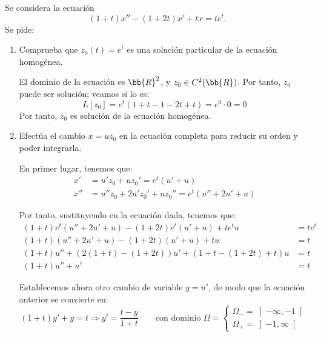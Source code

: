 \begin{ejercicio}\label{ej:4.4}
    Se considera la ecuación
    \[
        (1 + t)x'' - (1 + 2t)x' + tx = t e^t.
    \]
    Se pide:
    \begin{enumerate}
        \item Comprueba que $z_0(t) = e^t$ es una solución particular de la ecuación homogénea.
        
        El dominio de la ecuación es $\bb{R}^2$, y $z_0\in C^2(\bb{R})$. Por tanto, $z_0$ puede ser solución; veamos si lo es:
        \begin{equation*}
            L[z_0]=e^t(1+t-1-2t+t)=e^0\cdot 0=0
        \end{equation*}
        Por tanto, $z_0$ es solución de la ecuación homogénea.
        \item Efectúa el cambio $x = uz_0$ en la ecuación completa para reducir su orden y poder integrarla.
        
        En primer lugar, tenemos que:
        \begin{align*}
            x' &= u'z_0 + uz_0'=e^t(u'+u)\\
            x'' &= u''z_0 + 2u'z_0' + uz_0'' = e^t(u''+2u'+u)
        \end{align*}

        Por tanto, sustituyendo en la ecuación dada, tenemos que:
        \begin{align*}
            (1+t)e^t(u''+2u'+u)-(1+2t)e^t(u'+u)+te^t u &= te^t\\
            (1+t)(u''+2u'+u)-(1+2t)(u'+u)+tu &= t\\ 
            (1+t)u''+(2(1+t)-(1+2t))u' + (1+t-(1+2t)+t)u &= t\\
            (1+t)u''+u' &= t
        \end{align*}

        Establecemos ahora otro cambio de variable $y=u'$, de modo que la ecuación anterior se convierte en:
        \begin{equation*}
            (1+t)y'+y=t
            \Longrightarrow
            y'=\dfrac{t-y}{1+t} \qquad \text{con dominio } \Omega=\begin{cases}
                \Omega_-=\left]-\infty,-1\right[\\
                \Omega_+=\left]-1,\infty\right[
            \end{cases}
        \end{equation*}


\end{enumerate}
\end{ejercicio}
